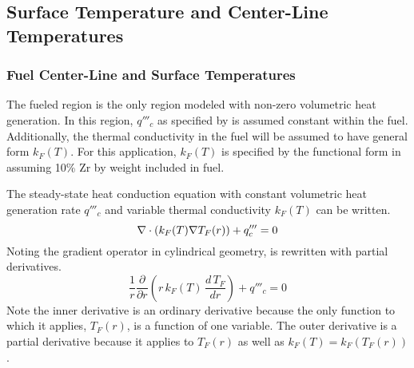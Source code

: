   \subsection{Surface Temperature and Center-Line Temperatures}
    \subsubsection{Fuel Center-Line and Surface Temperatures}
    The fueled region is the only region modeled with non-zero volumetric heat
    generation. In this region, $q'''_c$ as specified by 
     is assumed constant within the fuel. Additionally,
    the thermal conductivity in the fuel will be assumed to have general form
    $k_F(T)$. For this application, $k_F(T)$ is specified by the functional form
    in \cite{fuelProp} assuming 10\% Zr by weight included in fuel.

    The steady-state heat conduction equation with constant volumetric heat
    generation rate $q'''_c$ and variable thermal conductivity $k_F(T)$ can be
    written.
    \begin{equation}
      \label{eq:conduction_fuel}
      \mathbf{\nabla} \cdot (k_F(T) \mathbf{\nabla} T_F(r)) + q'''_c = 0
    \end{equation}
    Noting the gradient operator in cylindrical geometry,
     is rewritten with partial derivatives.
    \begin{equation}
      \label{eq:conduction_fuel_cylindrical}
      \frac{1}{r} \frac{\partial}{\partial r} \left( r \, k_F(T) \, 
        \frac{d \, T_F}{dr} \right) + q'''_c = 0
    \end{equation}
    Note the inner derivative is an ordinary derivative because the only
    function to which it applies, $T_F(r)$, is a function of one variable. The
    outer derivative is a partial derivative because it applies to $T_F(r)$ as
    well as $k_F(T) = k_F(T_F(r))$.

